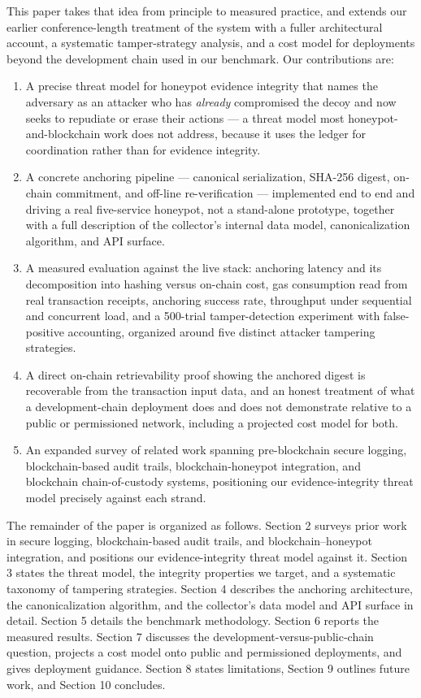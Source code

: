 \documentclass[journal]{IEEEtran}
\begin{document}
This paper takes that idea from principle to measured practice, and extends our earlier conference-length treatment of the system with a fuller architectural account, a systematic tamper-strategy analysis, and a cost model for deployments beyond the development chain used in our benchmark. Our contributions are:

\begin{enumerate}
\item A precise threat model for honeypot evidence integrity that names the adversary as an attacker who has \emph{already} compromised the decoy and now seeks to repudiate or erase their actions --- a threat model most honeypot-and-blockchain work does not address, because it uses the ledger for coordination rather than for evidence integrity.
\item A concrete anchoring pipeline --- canonical serialization, SHA-256 digest, on-chain commitment, and off-line re-verification --- implemented end to end and driving a real five-service honeypot, not a stand-alone prototype, together with a full description of the collector's internal data model, canonicalization algorithm, and API surface.
\item A measured evaluation against the live stack: anchoring latency and its decomposition into hashing versus on-chain cost, gas consumption read from real transaction receipts, anchoring success rate, throughput under sequential and concurrent load, and a 500-trial tamper-detection experiment with false-positive accounting, organized around five distinct attacker tampering strategies.
\item A direct on-chain retrievability proof showing the anchored digest is recoverable from the transaction input data, and an honest treatment of what a development-chain deployment does and does not demonstrate relative to a public or permissioned network, including a projected cost model for both.
\item An expanded survey of related work spanning pre-blockchain secure logging, blockchain-based audit trails, blockchain-honeypot integration, and blockchain chain-of-custody systems, positioning our evidence-integrity threat model precisely against each strand.
\end{enumerate}

The remainder of the paper is organized as follows. Section 2 surveys prior work in secure logging, blockchain-based audit trails, and blockchain--honeypot integration, and positions our evidence-integrity threat model against it. Section 3 states the threat model, the integrity properties we target, and a systematic taxonomy of tampering strategies. Section 4 describes the anchoring architecture, the canonicalization algorithm, and the collector's data model and API surface in detail. Section 5 details the benchmark methodology. Section 6 reports the measured results. Section 7 discusses the development-versus-public-chain question, projects a cost model onto public and permissioned deployments, and gives deployment guidance. Section 8 states limitations, Section 9 outlines future work, and Section 10 concludes.
\end{document}
